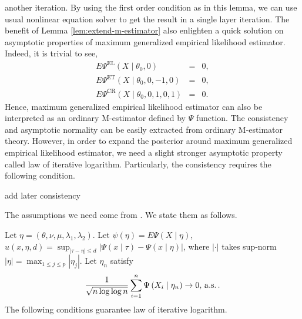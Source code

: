 another iteration. By using the first order condition as in this lemma,
we can use usual nonlinear equation solver to get the result in a
single layer iteration. The benefit of Lemma \ref{lem:extend-m-estimator}
also enlighten a quick solution on asymptotic properties of maximum
generalized empirical likelihood estimator. Indeed, it is trivial
to see, 
\begin{eqnarray*}
E\Psi^{\mathrm{EL}}\left(X\mid\theta_{0},0\right) & = & 0,\\
E\Psi^{\mathrm{ET}}\left(X\mid\theta_{0},0,-1,0\right) & = & 0,\\
E\Psi^{\mathrm{CR}}\left(X\mid\theta_{0},0,1,0,1\right) & = & 0.
\end{eqnarray*}
Hence, maximum generalized empirical likelihood estimator can also
be interpreted as an ordinary M-estimator defined by $\Psi$ function.
The consistency and asymptotic normality can be easily extracted from
ordinary M-estimator theory. However, in order to expand the posterior
around maximum generalized empirical likelihood estimator, we need
a slight stronger asymptotic property called law of iterative logarithm.
Particularly, the consistency requires the following condition.
\begin{assumption}
\label{assu:consistency-m-est}%
\begin{comment}
need to be specified
\end{comment}
add later consistency
\end{assumption}
The assumptions we need come from \citet{he1995law}. We state them
as follows.
\begin{assumption}
\label{assu:lil-m-est}Let $\eta=\left(\theta,\nu,\mu,\lambda_{1},\lambda_{2}\right)$.
Let $\psi\left(\eta\right)=E\Psi\left(X\mid\eta\right)$, $u\left(x,\eta,d\right)=\sup_{\left|\tau-\eta\right|\le d}\left|\Psi\left(x\mid\tau\right)-\Psi\left(x\mid\eta\right)\right|$,
where $\left|\cdot\right|$ takes sup-norm $\left|\eta\right|=\max_{1\le j\le p}\left|\eta_{j}\right|$.
Let $\eta_{n}$ satisfy 
\[
\frac{1}{\sqrt{n\log\log n}}\sum_{i=1}^{n}\Psi\left(X_{i}\mid\eta_{n}\right)\rightarrow0,\,\mathrm{a.s.}\,.
\]
 The following conditions guarantee law of iterative logarithm.\end{assumption}
